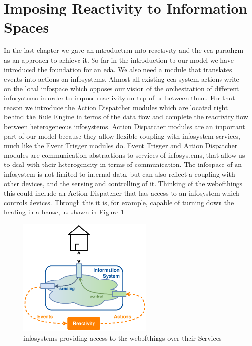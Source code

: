 \section{Imposing Reactivity to Information Spaces}
In the last chapter we gave an introduction into reactivity and the \textrm{\acrshort{eca}} paradigm as an approach to achieve it.
So far in the introduction to our model we have introduced the foundation for an \textrm{\acrlong{eda}}.
We also need a module that translates events into actions on \textrm{\glspl{infosystem}}.
Almost all existing \textrm{\acrshort{eca}} system actions write on the local \textrm{\gls{infospace}} which opposes our vision of the orchestration of different \textrm{\glspl{infosystem}} in order to impose reactivity on top of or between them.
For that reason we introduce the \textrm{Action Dispatcher} modules which are located right behind the \textrm{Rule Engine} in terms of the data flow and complete the reactivity flow between heterogeneous \textrm{\glspl{infosystem}}.
\textrm{Action Dispatcher} modules are an important part of our model because they allow flexible coupling with \textrm{\gls{infosystem}} services, much like the \textrm{Event Trigger} modules do.
\textrm{Event Trigger} and \textrm{Action Dispatcher} modules are communication abstractions to services of \textrm{\glspl{infosystem}}, that allow us to deal with their heterogeneity in terms of communication.
The \textrm{\gls{infospace}} of an \textrm{\gls{infosystem}} is not limited to internal data, but can also reflect a coupling with other devices, and the sensing and controlling of it.
Thinking of the \textrm{\gls{webofthings}} this could include an \textrm{Action Dispatcher} that has access to an \textrm{\gls{infosystem}} which controls devices.
Through this it is, for example, capable of turning down the heating in a house, as shown in Figure \ref{fig:InformationSystemWoT}.
\begin{figure}[!ht]
  \centering
  \includegraphics[width=0.6\textwidth]{figures/InformationSystemWoT}
  \caption{\textrm{\glspl{infosystem}} providing access to the \textrm{\gls{webofthings}} over their Services}
  \label{fig:InformationSystemWoT}
\end{figure}

